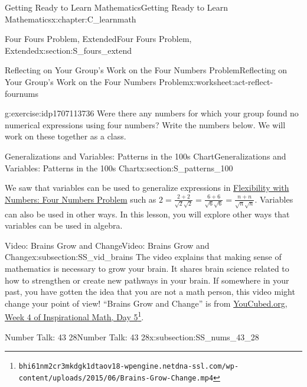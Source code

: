 \documentclass[oneside,10pt,]{book}
\numberwithin{equation}{chapter}
\begin{document}
\begin{chapterptx}{Getting Ready to Learn Mathematics}{}{Getting Ready to Learn Mathematics}{}{}{x:chapter:C_learnmath}
\begin{sectionptx}{Four Fours Problem, Extended}{}{Four Fours Problem, Extended}{}{}{x:section:S_fours_extend}
\begin{worksheet-subsection}{Reflecting on Your Group's Work on the Four Numbers Problem}{}{Reflecting on Your Group's Work on the Four Numbers Problem}{}{}{x:worksheet:act-reflect-fournums}
\begin{divisionexercise}{4}{}{}{g:exercise:idp1707113736}
Were there any numbers for which your group found no numerical expressions using four numbers? Write the numbers below. We will work on these together as a class.%
\end{divisionexercise}%
\end{worksheet-subsection}
\restoregeometry
\end{sectionptx}
%
%
\typeout{************************************************}
\typeout{************************************************}
%
\begin{sectionptx}{Generalizations and Variables: Patterns in the 100s Chart}{}{Generalizations and Variables: Patterns in the 100s Chart}{}{}{x:section:S_patterns_100}
\begin{introduction}{}%
We saw that variables can be used to generalize expressions in \hyperref[x:worksheet:act-four-nums-prob]{Flexibility with Numbers: Four Numbers Problem} such as \(2=\frac{2+2}{\sqrt2\sqrt2}=\frac{6+6}{\sqrt6\sqrt6}=\frac{n+n}{\sqrt n\sqrt n}\). Variables can also be used in other ways. In this lesson, you will explore other ways that variables can be used in algebra.%
\end{introduction}%
%
%
\typeout{************************************************}
\typeout{************************************************}
%
\begin{subsectionptx}{Video: Brains Grow and Change}{}{Video: Brains Grow and Change}{}{}{x:subsection:SS_vid_brains}
The video explains that making sense of mathematics is necessary to grow your brain. It shares brain science related to how to strengthen or create new pathways in your brain. If somewhere in your past, you have gotten the idea that you are not a math person, this video might change your point of view! ``Brains Grow and Change'' is from \href{https://bhi61nm2cr3mkdgk1dtaov18-wpengine.netdna-ssl.com/wp-content/uploads/2015/06/Brains-Grow-Change.mp4}{YouCubed.org, Week 4 of Inspirational Math, Day 5}\footnote{\nolinkurl{bhi61nm2cr3mkdgk1dtaov18-wpengine.netdna-ssl.com/wp-content/uploads/2015/06/Brains-Grow-Change.mp4}\label{g:fn:idp1707122056}}.%
\end{subsectionptx}
%
%
\typeout{************************************************}
\typeout{************************************************}
%
\begin{subsectionptx}{Number Talk: 43 \textminus{} 28}{}{Number Talk: 43 \textminus{} 28}{}{}{x:subsection:SS_nums_43_28}

\end{subsectionptx}
\end{sectionptx}
\end{chapterptx}
\end{document}
